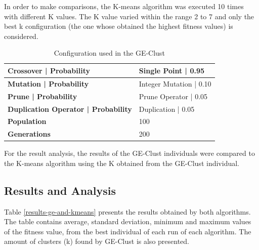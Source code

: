 \documentclass[conference,compsoc]{IEEEtran}
\begin{document}
In order to make comparisons, the K-means algorithm was executed 10 times with different K values. The K value varied within the range 2 to 7 and only the best k configuration (the one whose obtained the highest fitness values) is considered.


\begin{table}[]
	\centering
	\caption{Configuration used in the GE-Clust}
	\label{ge-configuration}
	\begin{tabular}{|l|l|}
		\hline
		\textbf{Crossover  |  Probability}         & Single Point  | 0.95     \\ \hline
		\textbf{Mutation | Probability}            & Integer Mutation          |  0.10 \\ \hline
		\textbf{Prune  | Probability}      & Prune Operator           | 0.05   \\ \hline
		\textbf{Duplication Operator | Probability} & Duplication   | 0.05     \\ \hline
		\textbf{Population}                        & 100                               \\ \hline
		\textbf{Generations}                       & 200                               \\ \hline
	\end{tabular}
\end{table}


For the result analysis, the results of the GE-Clust individuals were compared to the K-means algorithm using the K obtained from the GE-Clust individual.


\subsection{Results and Analysis}


Table \ref{results-ge-and-kmeans} presents the results obtained by both algorithms. The table contains average, 
standard deviation, minimum and maximum values of the fitness value, from the best individual of each run of each algorithm. The amount of clusters (k) found by GE-Clust is also presented.
\end{document}

